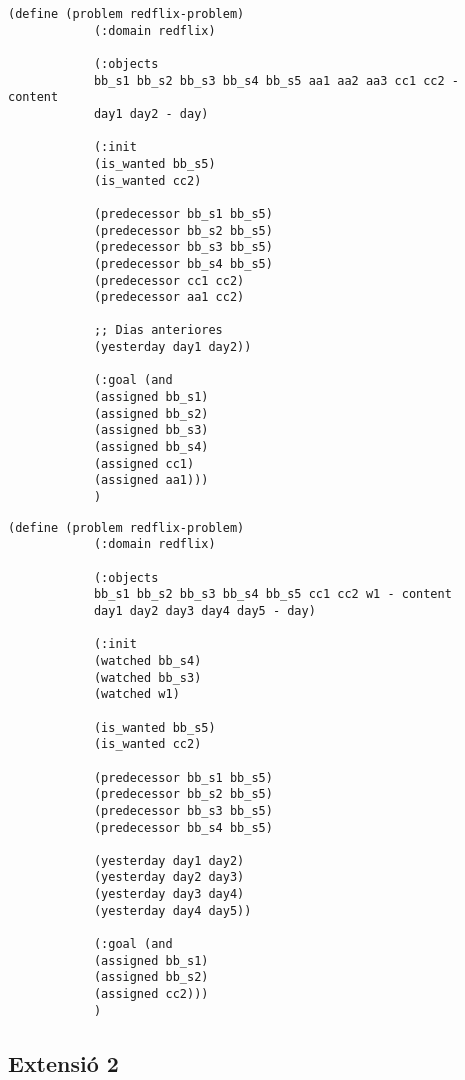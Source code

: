 \documentclass[a4paper]{article}
\begin{document}
	
	\noindent
	\begin{minipage}[t]{0.45\textwidth}
		\begin{lstlisting}[language=PDDL, caption={Joc de Prova 1 - Extensió 1}, label={lst:JP11}]                     
			(define (problem redflix-problem)
			(:domain redflix)
			
			(:objects
			bb_s1 bb_s2 bb_s3 bb_s4 bb_s5 aa1 aa2 aa3 cc1 cc2 - content
			day1 day2 - day)
			
			(:init
			(is_wanted bb_s5)
			(is_wanted cc2)
			
			(predecessor bb_s1 bb_s5)
			(predecessor bb_s2 bb_s5)
			(predecessor bb_s3 bb_s5)
			(predecessor bb_s4 bb_s5)
			(predecessor cc1 cc2)
			(predecessor aa1 cc2)
			
			;; Dias anteriores
			(yesterday day1 day2))
			
			(:goal (and
			(assigned bb_s1)
			(assigned bb_s2)
			(assigned bb_s3)
			(assigned bb_s4)
			(assigned cc1)
			(assigned aa1)))
			)
		\end{lstlisting}
		
	\end{minipage}
	\hfill
	\begin{minipage}[t]{0.45\textwidth}
		\begin{lstlisting}[language=PDDL, caption={Joc de Prova 2 - Extensió 1}, label={lst:JP21}]                     
			(define (problem redflix-problem)
			(:domain redflix)
			
			(:objects
			bb_s1 bb_s2 bb_s3 bb_s4 bb_s5 cc1 cc2 w1 - content
			day1 day2 day3 day4 day5 - day)
			
			(:init
			(watched bb_s4)
			(watched bb_s3)
			(watched w1)
			
			(is_wanted bb_s5)
			(is_wanted cc2)
			
			(predecessor bb_s1 bb_s5)
			(predecessor bb_s2 bb_s5)
			(predecessor bb_s3 bb_s5)
			(predecessor bb_s4 bb_s5)
			
			(yesterday day1 day2)
			(yesterday day2 day3)
			(yesterday day3 day4)
			(yesterday day4 day5))
			
			(:goal (and
			(assigned bb_s1)
			(assigned bb_s2)
			(assigned cc2)))
			)	
		\end{lstlisting}
	\end{minipage}	
	
	\subsection{Extensió 2}
	
\end{document}
